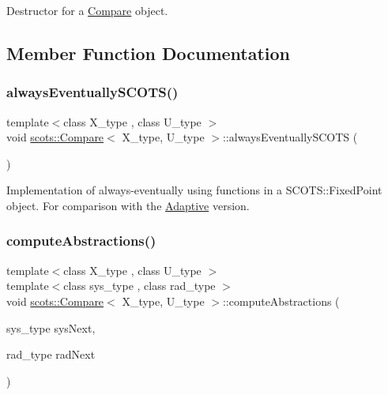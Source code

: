 Destructor for a \hyperlink{classscots_1_1Compare}{Compare} object. 

\subsection{Member Function Documentation}
\mbox{\label{classscots_1_1Compare_afbc28a076ac3c620d4eae4b8af905877}} 
\subsubsection{\texorpdfstring{always\+Eventually\+S\+C\+O\+T\+S()}{alwaysEventuallySCOTS()}}
{\footnotesize\ttfamily template$<$class X\+\_\+type , class U\+\_\+type $>$ \\
void \hyperlink{classscots_1_1Compare}{scots\+::\+Compare}$<$ X\+\_\+type, U\+\_\+type $>$\+::always\+Eventually\+S\+C\+O\+TS (\begin{DoxyParamCaption}{ }\end{DoxyParamCaption})\hspace{0.3cm}{\ttfamily [inline]}}

Implementation of always-\/eventually using functions in a S\+C\+O\+T\+S\+::\+Fixed\+Point object. For comparison with the \hyperlink{classscots_1_1Adaptive}{Adaptive} version. \mbox{\label{classscots_1_1Compare_a3bdf985c18d37edf8ee63ea00f6b2635}} 
\subsubsection{\texorpdfstring{compute\+Abstractions()}{computeAbstractions()}}
{\footnotesize\ttfamily template$<$class X\+\_\+type , class U\+\_\+type $>$ \\
template$<$class sys\+\_\+type , class rad\+\_\+type $>$ \\
void \hyperlink{classscots_1_1Compare}{scots\+::\+Compare}$<$ X\+\_\+type, U\+\_\+type $>$\+::compute\+Abstractions (\begin{DoxyParamCaption}\item[{sys\+\_\+type}]{sys\+Next,  }\item[{rad\+\_\+type}]{rad\+Next }\end{DoxyParamCaption})\hspace{0.3cm}{\ttfamily [inline]}}

